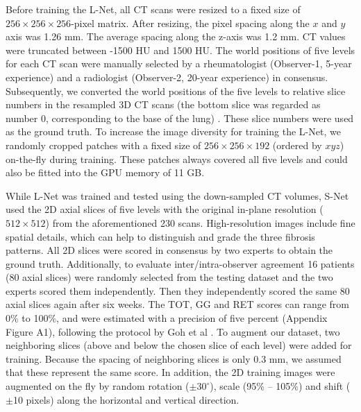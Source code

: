 Before training the L-Net, all CT scans were resized to a fixed size of $256 \times 256 \times 256$-pixel matrix. After resizing, the pixel spacing along the $x$ and $y$ axis was 1.26 mm. The average spacing along the z-axis was 1.2 mm. CT values were truncated between -1500 HU and 1500 HU. The world positions of five levels for each CT scan were manually selected by a rheumatologist (Observer-1, 5-year experience) and a radiologist (Observer-2, 20-year experience) in consensus. Subsequently, we converted the world positions of the five levels to relative slice numbers in the resampled 3D CT scans (the bottom slice was regarded as number 0, corresponding to the base of the lung) \cite{Jia2022}. These slice numbers were used as the ground truth. To increase the image diversity for training the L-Net, we randomly cropped patches with a fixed size of $256 \times 256 \times 192$ (ordered by $xyz$) on-the-fly during training. These patches always covered all five levels and could also be fitted into the GPU memory of 11 GB.

While L-Net was trained and tested using the down-sampled CT volumes, S-Net used the 2D axial slices of five levels with the original in-plane resolution ($512 \times 512$) from the aforementioned 230 scans. High-resolution images include fine spatial details, which can help to distinguish and grade the three fibrosis patterns. All 2D slices were scored in consensus by two experts to obtain the ground truth. Additionally, to evaluate inter/intra-observer agreement 16 patients (80 axial slices) were randomly selected from the testing dataset and the two experts scored them independently. Then they independently scored the same 80 axial slices again after six weeks. The TOT, GG and RET scores can range from 0\% to 100\%, and were estimated with a precision of five percent (Appendix Figure A1), following the protocol by Goh et al \cite{Goh2008}. To augment our dataset, two neighboring slices (above and below the chosen slice of each level) were added for training. Because the spacing of neighboring slices is only 0.3 mm, we assumed that these represent the same score. In addition, the 2D training images were augmented on the fly by random rotation ($\pm30^\circ$), scale (95\% – 105\%) and shift ($\pm$10 pixels) along the horizontal and vertical direction.

